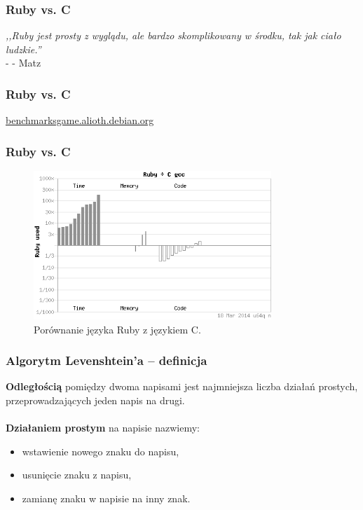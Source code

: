 \documentclass{beamer}
\begin{document}
  \begin{frame}
    \frametitle{Ruby vs. C}
    \begin{center}
      {\large {\color{gray} \textit{,,Ruby jest prosty z wyglądu, ale bardzo skomplikowany w środku, tak jak ciało ludzkie.''}\\\hfill - - Matz}}
    \end{center}
  \end{frame}

  \begin{frame}
    \frametitle{Ruby vs. C}
    \begin{center}
      \href{http://benchmarksgame.alioth.debian.org/u64q/benchmark.php?lang=yarv\&lang2=gcc}{benchmarksgame.alioth.debian.org}
    \end{center}
  \end{frame}

  \begin{frame}
    \frametitle{Ruby vs. C}
    \begin{center}
      \begin{figure}[h!]
        \caption{Porównanie języka Ruby z językiem C.}
        \centering
          \includegraphics[width=0.8\textwidth]{img/chartvs.png}
      \end{figure}
    \end{center}
  \end{frame}

  \begin{frame}
    \frametitle{Algorytm Levenshtein'a -- definicja}
    \textbf{Odległością} pomiędzy dwoma napisami jest najmniejsza liczba działań prostych, przeprowadzających jeden napis na drugi. \\~\\
    \textbf{Działaniem prostym} na napisie nazwiemy:
    \begin{itemize}
      \item wstawienie nowego znaku do napisu,
      \item usunięcie znaku z napisu,
      \item zamianę znaku w napisie na inny znak.
    \end{itemize}
  \end{frame}
\end{document}
